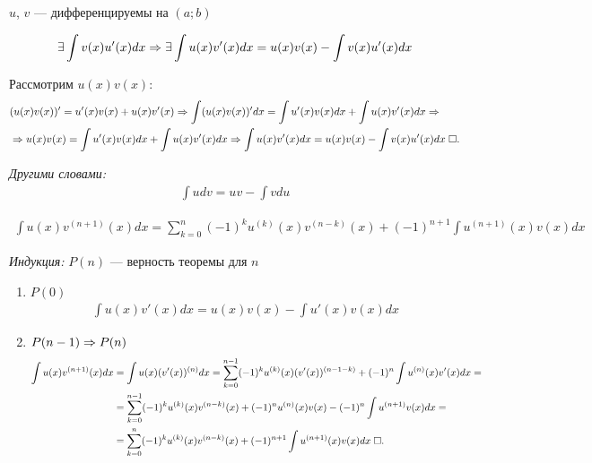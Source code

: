\documentclass{article}
\begin{document}


$u$, $v$ --- дифференцируемы на $(a;b)$

\begin{align*}
	\exists \int v(x)u'(x)dx\Rarr \exists\int u(x)v'(x)dx=u(x)v(x)-\int v(x)u'(x)dx
\end{align*}

\proof

Рассмотрим $u(x)v(x)$:
\begin{align*}
	 & (u(x)v(x))'=u'(x)v(x)+u(x)v'(x)\Rarr\int (u(x)v(x))'dx=\int u'(x)v(x)dx+\int u(x)v'(x)dx\Rarr       \\
	 & \Rarr u(x)v(x)=\int u'(x)v(x)dx+\int u(x)v'(x)dx\Rarr\int u(x)v'(x)dx=u(x)v(x)-\int v(x)u'(x)dx\qed
\end{align*}

{\it Другими словами:}
\begin{align*}
	\int udv=uv-\int vdu
\end{align*}

\begin{align*}
	\int u(x)v^{(n+1)}(x)dx=\sum_{k=0}^{n}(-1)^{k}u^{(k)}(x)v^{(n-k)}(x)+(-1)^{n+1}\int u^{(n+1)}(x)v(x)dx
\end{align*}

\proof

{\it Индукция:} $P(n)$ --- верность теоремы для $n$
\begin{enumerate}
	\item{}$P(0)$
	\begin{align*}
		\int u(x)v'(x)dx=u(x)v(x)-\int u'(x)v(x)dx
	\end{align*}
	\item{}$P(n-1)\Rarr P(n)$
	\begin{align*}
		\int u(x)v^{(n+1)}(x)dx
		 & =\int u(x)(v'(x))^{(n)}dx=\sum_{k=0}^{n-1}(-1)^{k}u^{(k)}(x)(v'(x))^{(n-1-k)}+(-1)^{n}\int u^{(n)}(x)v'(x)dx= \\
		 & =\sum_{k=0}^{n-1}(-1)^{k}u^{(k)}(x)v^{(n-k)}(x)+(-1)^{n}u^{(n)}(x)v(x)-(-1)^{n}\int u^{(n+1)}v(x)dx=          \\
		 & =\sum_{k=0}^{n}(-1)^{k}u^{(k)}(x)v^{(n-k)}(x)+(-1)^{n+1}\int u^{(n+1)}(x)v(x)dx\qed
	\end{align*}
\end{enumerate}

\pagebreak
\end{document}
